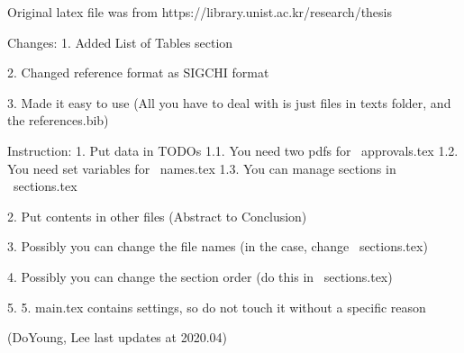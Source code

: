Original latex file was from https://library.unist.ac.kr/research/thesis

Changes:
1. Added List of Tables section

2. Changed reference format as SIGCHI format

3. Made it easy to use (All you have to deal with is just files in texts folder, and the references.bib)


Instruction:
1. Put data in TODOs
 1.1. You need two pdfs for ~approvals.tex
 1.2. You need set variables for ~names.tex
 1.3. You can manage sections in ~sections.tex
 
2. Put contents in other files (Abstract to Conclusion)

3. Possibly you can change the file names (in the case, change ~sections.tex)

4. Possibly you can change the section order (do this in ~sections.tex)

5. 5. main.tex contains settings, so do not touch it without a specific reason


(DoYoung, Lee last updates at 2020.04)